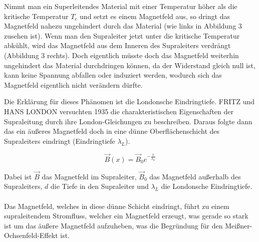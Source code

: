 Nimmt man ein Superleitendes Material mit einer Temperatur höher als die kritische Temperatur $T_c$
und setzt es einem Magnetfeld aus, so dringt das Magnetfeld nahezu ungehindert durch das Material (wie links in Abbildung 3 zusehen ist). 
Wenn man den Supraleiter jetzt unter die kritische Temperatur abkühlt, wird das Magnetfeld aus dem Inneren des Supraleiters verdrängt (Abbildung 3 rechts).
Doch eigentlich müsste doch das Magnetfeld weiterhin ungehindert das Material durchdringen können, da der 
Widerstand gleich null ist, kann keine Spannung abfallen oder induziert werden, wodurch sich das Magnetfeld 
eigentlich nicht verändern dürfte.

Die Erklärung für dieses Phänomen ist die Londonsche Eindringtiefe. FRITZ und HANS LONDON
versuchten 1935 die charakteristischen Eigenschaften der Supraleitung durch ihre London-Gleichungen 
zu beschreiben. Daraus folgte dann das ein äußeres Magnetfeld doch in eine dünne Oberflächenschicht des Supraleiters eindringt (Eindringtiefe $\lambda_L$).

\begin{equation}
    \vec{B}(x) = \vec{B}_0 e^{-\frac{x}{\lambda_L}}
\end{equation}

Dabei ist $\vec{B}$ das Magnetfeld im Supraleiter, $\vec{B}_0$ das Magnetfeld außerhalb des Supraleiters, $d$ die Tiefe in den Supraleiter und $\lambda_L$ die Londonsche Eindringtiefe.
\\
\\
Das Magnetfeld, welches in diese dünne Schicht eindringt, führt zu einem supraleitendem Stromfluss, welcher ein
Magnetfeld erzeugt, was gerade so stark ist um das äußere Magnetfeld aufzuheben, was 
die Begründung für den Meißner-Ochsenfeld-Effekt ist. 

